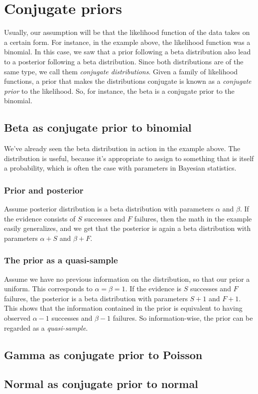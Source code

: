 \documentclass[12pt, a4paper]{article}
\begin{document}
\section{Conjugate priors}
Usually, our assumption will be that the likelihood function of the data takes on a certain form. For instance, in the example above, the likelihood function was a binomial. In this case, we saw that a prior following a beta distribution also lead to a posterior following a beta distribution. Since both distributions are of the same type, we call them \textit{conjugate distributions}. Given a family of likelihood functions, a prior that makes the distributions conjugate is known as a \textit{conjugate prior} to the likelihood. So, for instance, the beta is a conjugate prior to the binomial.

\subsection{Beta as conjugate prior to binomial}
We've already seen the beta distribution in action in the example above. The distribution is useful, because it's appropriate to assign to something that is itself a probability, which is often the case with parameters in Bayesian statistics.

\subsubsection{Prior and posterior}
Assume posterior distribution is a beta distribution with parameters $\alpha$ and $\beta$. If the evidence consists of $S$ successes and $F$ failures, then the math in the example easily generalizes, and we get that the posterior is again a beta distribution with parameters $\alpha+S$ and $\beta+F$.

\subsubsection{The prior as a quasi-sample}
Assume we have no previous information on the distribution, so that our prior a uniform. This corresponds to $\alpha=\beta=1$. If the evidence is $S$ successes and $F$ failures, the posterior is a beta distribution with parameters $S+1$ and $F+1$. This shows that the information contained in the prior is equivalent to having observed $\alpha-1$ successes and $\beta-1$ failures. So information-wise, the prior can be regarded as a \textit{quasi-sample}.

\subsection{Gamma as conjugate prior to Poisson}


\subsection{Normal as conjugate prior to normal}
\end{document}
